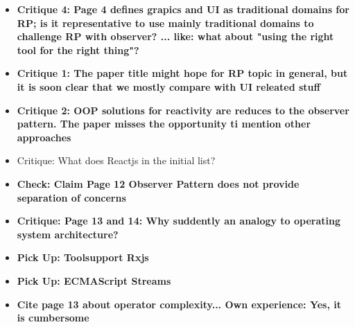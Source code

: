 \documentclass[12pt,a4paper]{article}
\begin{document}
\begin{itemize}
	\item \textbf{Critique 4: Page 4 defines grapics and UI as traditional domains for RP; is it representative to use mainly traditional domains to challenge RP with observer? ... like: what about "using the right tool for the right thing"?}
	\item \textbf{Critique 1: The paper title might hope for RP topic in general, but it is soon clear that we mostly compare with UI releated stuff}
	\item \textbf{Critique 2: OOP solutions for reactivity are reduces to the observer pattern. The paper misses the opportunity ti mention other approaches}
	\item Critique: What does Reactjs in the initial list?
\end{itemize}

\begin{itemize}
	\item \textbf{Check: Claim Page 12 Observer Pattern does not provide separation of concerns}
	\item \textbf{Critique: Page 13 and 14: Why suddently an analogy to operating system architecture?}
\end{itemize}


\begin{itemize}
	\item \textbf{Pick Up: Toolsupport Rxjs}
	\item \textbf{Pick Up: ECMAScript Streams}
	\item \textbf{Cite page 13 about operator complexity... Own experience: Yes, it is cumbersome}
\end{itemize}
\end{document}
